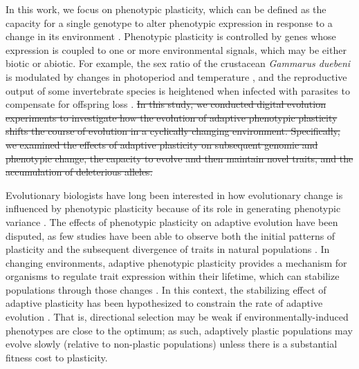 \documentclass[utf8]{frontiersSCNS} %
\providecommand{\DIFdeltex}[1]{{\protect\color{red}\sout{#1}}}                      %
\providecommand{\DIFdelbegin}{} %
\providecommand{\DIFdelend}{} %
\providecommand{\DIFdel}[1]{\texorpdfstring{\DIFdeltex{#1}}{}} %
\newcommand{\DIFscaledelfig}{0.5}
\newlength{\DIFdelgraphicswidth} %
\newlength{\DIFdelgraphicsheight} %
\newcommand{\DIFdelincludegraphics}[2][]{%
\sbox{\DIFdelgraphicsbox}{\DIFOincludegraphics[#1]{#2}}%
\settoboxwidth{\DIFdelgraphicswidth}{\DIFdelgraphicsbox} %
\settoboxtotalheight{\DIFdelgraphicsheight}{\DIFdelgraphicsbox} %
\scalebox{\DIFscaledelfig}{%
\parbox[b]{\DIFdelgraphicswidth}{\usebox{\DIFdelgraphicsbox}\\[-\baselineskip] \rule{\DIFdelgraphicswidth}{0em}}\llap{\resizebox{\DIFdelgraphicswidth}{\DIFdelgraphicsheight}{%
\setlength{\unitlength}{\DIFdelgraphicswidth}%
\begin{picture}(1,1)%
\thicklines\linethickness{2pt} %
{\color[rgb]{1,0,0}\put(0,0){\framebox(1,1){}}}%
{\color[rgb]{1,0,0}\put(0,0){\line( 1,1){1}}}%
{\color[rgb]{1,0,0}\put(0,1){\line(1,-1){1}}}%
\end{picture}%
}\hspace*{3pt}}} %
} %
\DeclareRobustCommand{\DIFdelbegin}{\DIFOdelbegin \let\includegraphics\DIFdelincludegraphics} %
\DeclareRobustCommand{\DIFdelend}{\DIFOaddend \let\includegraphics\DIFOincludegraphics} %
\begin{document}
\begin{raggedbottom}
In this work, we focus on phenotypic plasticity, which can be defined as the capacity for a single genotype to alter phenotypic expression in response to a change in its environment \citep{west-eberhard_developmental_2003}.
Phenotypic plasticity is controlled by genes whose expression is coupled to one or more environmental signals, which may be either biotic or abiotic.
For example, the sex ratio of the crustacean \textit{Gammarus duebeni} is modulated by changes in photoperiod and temperature \citep{dunn_two_2005}, and the reproductive output of some invertebrate species is heightened when infected with parasites to compensate for offspring loss \citep{chadwick_parasite-mediated_2005}.
\DIFdelbegin \DIFdel{In this study, we conducted digital evolution experiments to investigate how the evolution of adaptive phenotypic plasticity shifts the course of evolution in a cyclically changing environment.
Specifically, we examined the effects of adaptive plasticity on subsequent genomic and phenotypic change, the capacity to evolve and then maintain novel traits, and the accumulation of deleterious alleles.
}\DIFdelend %


Evolutionary biologists have long been interested in how evolutionary change is influenced by phenotypic plasticity because of its role in generating phenotypic variance \citep{gibert_phenotypic_2019}.
The effects of phenotypic plasticity on adaptive evolution have been disputed, as few studies have been able to observe both the initial patterns of plasticity and the subsequent divergence of traits in natural populations \citep{ghalambor_adaptive_2007,wund_assessing_2012,forsman_rethinking_2015,ghalambor_non-adaptive_2015,hendry_key_2016}.
In changing environments, adaptive phenotypic plasticity provides a mechanism for organisms to regulate trait expression within their lifetime, which can stabilize populations through those changes \citep{gibert_phenotypic_2019}.
In this context, the stabilizing effect of adaptive plasticity has been hypothesized to constrain the rate of adaptive evolution \citep{gupta_study_1982,ancel_undermining_2000,huey_behavioral_2003,price_role_2003,paenke_influence_2007}.
That is, directional selection may be weak if environmentally-induced phenotypes are close to the optimum; as such, adaptively plastic populations may evolve slowly (relative to non-plastic populations) unless there is a substantial fitness cost to plasticity.


\end{raggedbottom}
\end{document}
